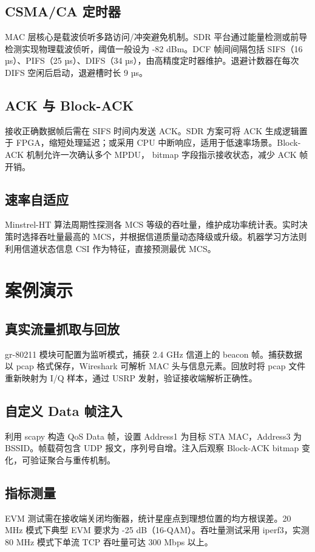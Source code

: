 \section{CSMA/CA 定时器}
MAC 层核心是载波侦听多路访问/冲突避免机制。SDR 平台通过能量检测或前导检测实现物理载波侦听，阈值一般设为 -82 dBm。DCF 帧间间隔包括 SIFS（16 µs）、PIFS（25 µs）、DIFS（34 µs），由高精度定时器维护。退避计数器在每次 DIFS 空闲后启动，退避槽时长 9 µs。\par
\section{ACK 与 Block-ACK}
接收正确数据帧后需在 SIFS 时间内发送 ACK。SDR 方案可将 ACK 生成逻辑置于 FPGA，缩短处理延迟；或采用 CPU 中断响应，适用于低速率场景。Block-ACK 机制允许一次确认多个 MPDU， bitmap 字段指示接收状态，减少 ACK 帧开销。\par
\section{速率自适应}
Minstrel-HT 算法周期性探测各 MCS 等级的吞吐量，维护成功率统计表。实时决策时选择吞吐量最高的 MCS，并根据信道质量动态降级或升级。机器学习方法则利用信道状态信息 CSI 作为特征，直接预测最优 MCS。\par
\chapter{案例演示}
\section{真实流量抓取与回放}
gr-80211 模块可配置为监听模式，捕获 2.4 GHz 信道上的 beacon 帧。捕获数据以 pcap 格式保存，Wireshark 可解析 MAC 头与信息元素。回放时将 pcap 文件重新映射为 I/Q 样本，通过 USRP 发射，验证接收端解析正确性。\par
\section{自定义 Data 帧注入}
利用 scapy 构造 QoS Data 帧，设置 Address1 为目标 STA MAC，Address3 为 BSSID。帧载荷包含 UDP 报文，序列号自增。注入后观察 Block-ACK bitmap 变化，可验证聚合与重传机制。\par
\section{指标测量}
EVM 测试需在接收端关闭均衡器，统计星座点到理想位置的均方根误差。20 MHz 模式下典型 EVM 要求为 -25 dB（16-QAM）。吞吐量测试采用 iperf3，实测 80 MHz 模式下单流 TCP 吞吐量可达 300 Mbps 以上。\par
